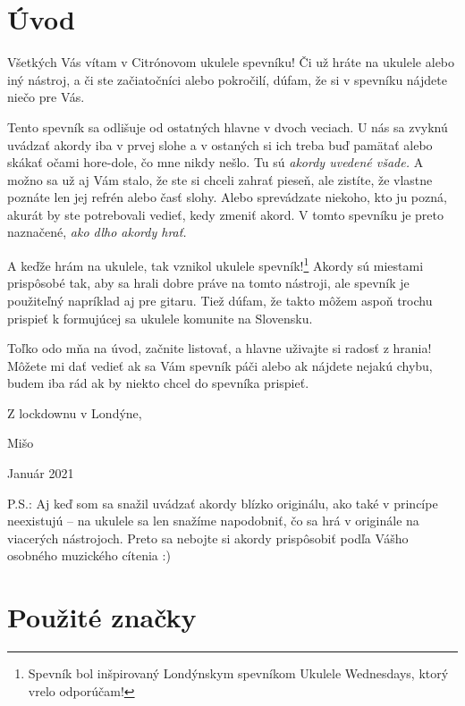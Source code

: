\begingroup %
\setlength{\parindent}{0pt}
\setlength{\parskip}{\baselineskip}
\large

\section*{Úvod}

Všetkých Vás vítam v Citrónovom ukulele spevníku! Či už hráte na ukulele alebo iný nástroj,
a či ste začiatočníci alebo pokročilí, dúfam, že si v spevníku nájdete niečo pre Vás.

Tento spevník sa odlišuje od ostatných hlavne v dvoch veciach. U nás sa zvyknú uvádzať akordy
iba v prvej slohe a v ostaných si ich treba buď pamätať alebo skákať očami hore-dole, čo mne
nikdy nešlo. Tu sú \emph{akordy uvedené všade.} A možno sa už aj Vám stalo, že ste si
chceli zahrať pieseň, ale zistíte, že vlastne poznáte len jej refrén alebo časť slohy.
Alebo sprevádzate niekoho, kto ju pozná, akurát by ste potrebovali vedieť, kedy zmeniť akord.
V tomto spevníku je preto naznačené, \emph{ako dlho akordy hrať.}

A keďže hrám na ukulele, tak vznikol ukulele spevník!\footnote{Spevník bol inšpirovaný Londýnskym
spevníkom Ukulele Wednesdays, ktorý vrelo odporúčam!} Akordy sú miestami prispôsobé tak, aby sa
hrali dobre práve na tomto nástroji, ale spevník je použiteľný napríklad aj pre gitaru. Tiež dúfam,
že takto môžem aspoň trochu prispieť k formujúcej sa ukulele komunite na Slovensku.

Toľko odo mňa na úvod, začnite listovať, a hlavne uživajte si radosť z hrania! Môžete
mi dať vedieť ak sa Vám spevník páči alebo ak nájdete nejakú chybu, budem iba rád ak
by niekto chcel do spevníka prispieť.

Z lockdownu v Londýne,

{
\hspace{1cm}
Mišo

\hspace{1cm}
Január 2021
}

\bigskip

P.S.: Aj keď som sa snažil uvádzať akordy blízko originálu,  ako také
v princípe neexistujú -- na ukulele sa len snažíme napodobniť, čo sa hrá v originále
na viacerých nástrojoch. Preto sa nebojte si akordy prispôsobiť podľa Vášho osobného muzického
cítenia :)

\section*{Použité značky}

